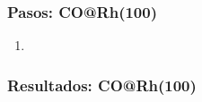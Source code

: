 \subsubsection{Pasos: CO@Rh(100)}

  \begin{enumerate}
    \item
      \begin{verbatim}

      \end{verbatim}
  \end{enumerate}

\subsubsection{Resultados: CO@Rh(100)}
